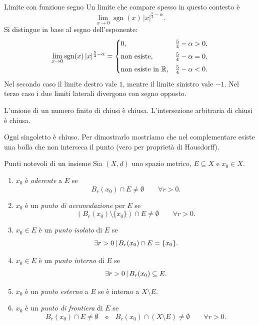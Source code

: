 \documentclass[a4paper]{article}
\begin{document}
\begin{snippetexample}{Limite con funzione segno}
    Un limite che compare spesso in questo contesto è
    \[
        \lim_{x\to 0}\operatorname{sgn}(x)\,|x|^{\frac{5}{4}-\alpha}.
    \]
    Si distingue in base al segno dell'esponente:
    \[
        \lim_{x\to 0}\operatorname{sgn}(x)\,|x|^{\frac{5}{4}-\alpha}
        =
        \begin{cases}
            0, & \frac{5}{4}-\alpha>0,\\[4pt]
            \text{non esiste}, & \frac{5}{4}-\alpha=0,\\[4pt]
            \text{non esiste in } \mathbb{R}, & \frac{5}{4}-\alpha<0.
        \end{cases}
    \]
    Nel secondo caso il limite destro vale \(1\), mentre il limite sinistro vale \(-1\). Nel terzo caso i due limiti laterali divergono con segno opposto.
\end{snippetexample}

\begin{snippetproposition}{}
    L'unione di un numero finito di chiusi è chiusa. L'intersezione arbitraria di chiusi è chiusa.
\end{snippetproposition}

Ogni singoletto è chiuso. Per dimostrarlo mostriamo che nel complementare
esiste una bolla che non interseca il punto (vero per proprietà di Hausdorff).

\begin{snippetdefinition}{Punti notevoli di un insieme}
    Sia \((X,d)\) uno spazio metrico, \(E\subseteq X\) e \(x_0\in X\).
    \begin{enumerate}
        \item \(x_0\) è \emph{aderente} a \(E\) se
        \[
            B_r(x_0)\cap E\neq\emptyset
            \qquad \forall r>0.
        \]
        \item \(x_0\) è un \emph{punto di accumulazione} per \(E\) se
        \[
            \left(B_r(x_0)\setminus\{x_0\}\right)\cap E\neq\emptyset
            \qquad \forall r>0.
        \]
        \item \(x_0\in E\) è un \emph{punto isolato} di \(E\) se
        \[
            \exists r>0 \,|\, B_r(x_0)\cap E=\{x_0\}.
        \]
        \item \(x_0\in E\) è un \emph{punto interno} di \(E\) se
        \[
            \exists r>0 \,|\, B_r(x_0)\subseteq E.
        \]
        \item \(x_0\) è un \emph{punto esterno} a \(E\) se è interno a \(X\setminus E\).
        \item \(x_0\) è un \emph{punto di frontiera} di \(E\) se
        \[
            B_r(x_0)\cap E\neq\emptyset
            \quad\text{e}\quad
            B_r(x_0)\cap(X\setminus E)\neq\emptyset
            \qquad \forall r>0.
        \]
    \end{enumerate}
\end{snippetdefinition}
\end{document}
